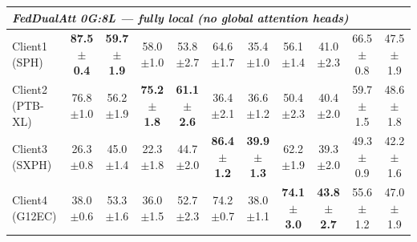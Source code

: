 \documentclass[a4paper]{article}
\begin{document}
\begin{longtable}{l|cc|cc|cc|cc|cc}
  \multicolumn{11}{l}{\textit{FedDualAtt 0G:8L --- fully local (no global attention heads)}} \\
  \midrule
  Client1 (SPH)    & \textbf{87.5$\pm$0.4} & \textbf{59.7$\pm$1.9} & 58.0$\pm$1.0 & 53.8$\pm$2.7 & 64.6$\pm$1.7 & 35.4$\pm$1.0 & 56.1$\pm$1.4 & 41.0$\pm$2.3 & 66.5$\pm$0.8 & 47.5$\pm$1.9 \\
  Client2 (PTB-XL) & 76.8$\pm$1.0 & 56.2$\pm$1.9 & \textbf{75.2$\pm$1.8} & \textbf{61.1$\pm$2.6} & 36.4$\pm$2.1 & 36.6$\pm$1.2 & 50.4$\pm$2.3 & 40.4$\pm$2.0 & 59.7$\pm$1.5 & 48.6$\pm$1.8 \\
  Client3 (SXPH)   & 26.3$\pm$0.8 & 45.0$\pm$1.4 & 22.3$\pm$1.8 & 44.7$\pm$2.0 & \textbf{86.4$\pm$1.2} & \textbf{39.9$\pm$1.3} & 62.2$\pm$1.9 & 39.3$\pm$2.0 & 49.3$\pm$0.9 & 42.2$\pm$1.6 \\
  Client4 (G12EC)  & 38.0$\pm$0.6 & 53.3$\pm$1.6 & 36.0$\pm$1.5 & 52.7$\pm$2.3 & 74.2$\pm$0.7 & 38.0$\pm$1.1 & \textbf{74.1$\pm$3.0} & \textbf{43.8$\pm$2.7} & 55.6$\pm$1.2 & 47.0$\pm$1.9 \\
\end{longtable}
\normalsize
\end{document}
